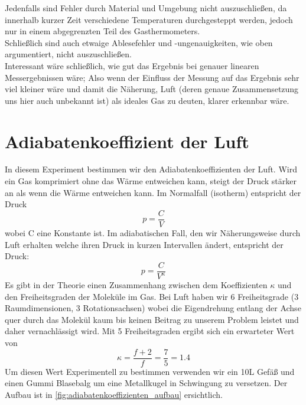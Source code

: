 \documentclass[12pt,a4paper]{article}
\begin{document}
\begin{multicols}{2}
Jedenfalls sind Fehler durch Material und Umgebung nicht auszuschließen, da innerhalb kurzer Zeit verschiedene Temperaturen durchgesteppt werden, jedoch nur in einem abgegrenzten Teil des Gasthermometers.\\
Schließlich sind auch etwaige Ablesefehler und -ungenauigkeiten, wie oben argumentiert, nicht auszuschließen.\\
Interessant wäre schließlich, wie gut das Ergebnis bei genauer linearen Messergebnissen wäre; Also wenn der Einfluss der Messung auf das Ergebnis sehr viel kleiner wäre und damit die Näherung, Luft (deren genaue Zusammensetzung uns hier auch unbekannt ist) als ideales Gas zu deuten, klarer erkennbar wäre.


\section{Adiabatenkoeffizient der Luft}
In diesem Experiment bestimmen wir den Adiabatenkoeffizienten der Luft. Wird ein Gas komprimiert ohne das Wärme entweichen kann, steigt der Druck stärker an als wenn die Wärme entweichen kann. Im Normalfall (isotherm) entspricht der Druck
$$p = \frac{C}{V}$$
wobei C eine Konstante ist.
Im adiabatischen Fall, den wir Näherungsweise durch Luft erhalten welche ihren Druck in kurzen Intervallen ändert, entspricht der Druck:
$$p = \frac{C}{V^\kappa}$$
Es gibt in der Theorie einen Zusammenhang zwischen dem Koeffizienten $\kappa$ und den Freiheitsgraden der Moleküle im Gas. Bei Luft haben wir 6 Freiheitsgrade (3 Raumdimensionen, 3 Rotationsachsen) wobei die Eigendrehung entlang der Achse quer durch das Molekül kaum bis keinen Beitrag zu unserem Problem leistet und daher vernachlässigt wird. Mit 5 Freiheitsgraden ergibt sich ein erwarteter Wert von
$$\kappa = \frac{f+2}{f} = \frac{7}{5} = 1.4$$
Um diesen Wert Experimentell zu bestimmen verwenden wir ein 10L Gefäß und einen Gummi Blasebalg um eine Metallkugel in Schwingung zu versetzen. Der Aufbau ist in \ref{fig:adiabatenkoeffizienten_aufbau} ersichtlich.
\begin{figure}[H]
	\centering

\end{figure}
\end{multicols}
\end{document}
